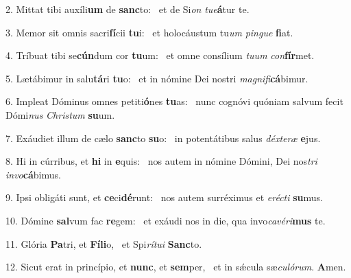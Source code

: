 2. Mittat tibi auxíli\textbf{um} de \textbf{sanc}to: \ast\  et de Si\textit{on} \textit{tu}\textit{e}\textbf{á}tur te.\

3. Memor sit omnis sacri\textbf{fí}cii \textbf{tu}i: \ast\  et holocáustum tu\textit{um} \textit{pin}\textit{gue} \textbf{fi}at.\

4. Tríbuat tibi se\textbf{cún}dum cor \textbf{tu}um: \ast\  et omne consílium \textit{tu}\textit{um} \textit{con}\textbf{fír}met.\

5. Lætábimur in salu\textbf{tá}ri \textbf{tu}o: \ast\  et in nómine Dei nostri \textit{ma}\textit{gni}\textit{fi}\textbf{cá}bimur.\

6. Impleat Dóminus omnes petiti\textbf{ó}nes \textbf{tu}as: \ast\  nunc cognóvi quóniam salvum fecit Dómi\textit{nus} \textit{Chris}\textit{tum} \textbf{su}um.\

7. Exáudiet illum de cælo \textbf{sanc}to \textbf{su}o: \ast\  in potentátibus salus \textit{déx}\textit{te}\textit{ræ} \textbf{e}jus.\

8. Hi in cúrribus, et \textbf{hi} in \textbf{e}quis: \ast\  nos autem in nómine Dómini, Dei nos\textit{tri} \textit{in}\textit{vo}\textbf{cá}bimus.\

9. Ipsi obligáti sunt, et \textbf{ce}ci\textbf{dé}runt: \ast\  nos autem surréximus et \textit{e}\textit{réc}\textit{ti} \textbf{su}mus.\

10. Dómine \textbf{sal}vum fac \textbf{re}gem: \ast\  et exáudi nos in die, qua invo\textit{ca}\textit{vé}\textit{ri}\textbf{mus} te.\

11. Glória \textbf{Pa}tri, et \textbf{Fí}\textbf{li}o, \ast\  et Spi\textit{rí}\textit{tu}\textit{i} \textbf{Sanc}to.\

12. Sicut erat in princípio, et \textbf{nunc}, et \textbf{sem}per, \ast\  et in sǽcula sæ\textit{cu}\textit{ló}\textit{rum}. \textbf{A}men.\


